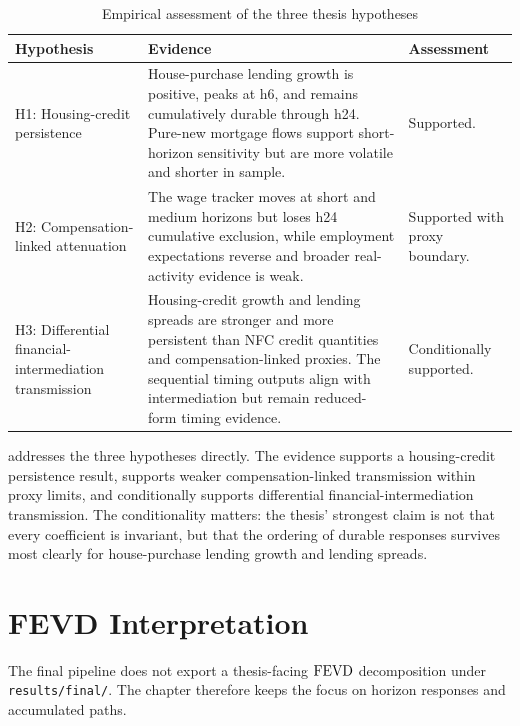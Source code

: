 \begin{table}[htbp]
  \centering
  \caption{Empirical assessment of the three thesis hypotheses}
  \label{tab:hypothesis-assessment}
  \small
  \setlength{\tabcolsep}{5pt}
  \begin{tabularx}{\textwidth}{@{}>{\raggedright\arraybackslash}p{}>{\raggedright\arraybackslash}X>{\raggedright\arraybackslash}p{}@{}}
    \toprule
    Hypothesis & Evidence & Assessment \\
    \midrule
    H1: Housing-credit persistence & House-purchase lending growth is positive, peaks at h6, and remains cumulatively durable through h24. Pure-new mortgage flows support short-horizon sensitivity but are more volatile and shorter in sample. & Supported. \\
    H2: Compensation-linked attenuation & The wage tracker moves at short and medium horizons but loses h24 cumulative exclusion, while employment expectations reverse and broader real-activity evidence is weak. & Supported with proxy boundary. \\
    H3: Differential financial-intermediation transmission & Housing-credit growth and lending spreads are stronger and more persistent than NFC credit quantities and compensation-linked proxies. The sequential timing outputs align with intermediation but remain reduced-form timing evidence. & Conditionally supported. \\
    \bottomrule
  \end{tabularx}
\end{table}

 addresses the three hypotheses directly. The evidence supports a housing-credit persistence result, supports weaker compensation-linked transmission within proxy limits, and conditionally supports differential financial-intermediation transmission. The conditionality matters: the thesis' strongest claim is not that every coefficient is invariant, but that the ordering of durable responses survives most clearly for house-purchase lending growth and lending spreads.

\section{FEVD Interpretation}

The final pipeline does not export a thesis-facing \(\operatorname{FEVD}\) decomposition under \nolinkurl{results/final/}. The chapter therefore keeps the focus on horizon responses and accumulated paths.

